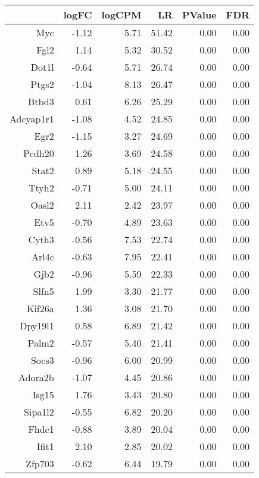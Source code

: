 \begin{table}[ht]
\centering
\begin{tabular}{rrrrrr}
  \hline
 & logFC & logCPM & LR & PValue & FDR \\ 
  \hline
Myc & -1.12 & 5.71 & 51.42 & 0.00 & 0.00 \\ 
  Fgl2 & 1.14 & 5.32 & 30.52 & 0.00 & 0.00 \\ 
  Dot1l & -0.64 & 5.71 & 26.74 & 0.00 & 0.00 \\ 
  Ptgs2 & -1.04 & 8.13 & 26.47 & 0.00 & 0.00 \\ 
  Btbd3 & 0.61 & 6.26 & 25.29 & 0.00 & 0.00 \\ 
  Adcyap1r1 & -1.08 & 4.52 & 24.85 & 0.00 & 0.00 \\ 
  Egr2 & -1.15 & 3.27 & 24.69 & 0.00 & 0.00 \\ 
  Pcdh20 & 1.26 & 3.69 & 24.58 & 0.00 & 0.00 \\ 
  Stat2 & 0.89 & 5.18 & 24.55 & 0.00 & 0.00 \\ 
  Ttyh2 & -0.71 & 5.00 & 24.11 & 0.00 & 0.00 \\ 
  Oasl2 & 2.11 & 2.42 & 23.97 & 0.00 & 0.00 \\ 
  Etv5 & -0.70 & 4.89 & 23.63 & 0.00 & 0.00 \\ 
  Cyth3 & -0.56 & 7.53 & 22.74 & 0.00 & 0.00 \\ 
  Arl4c & -0.63 & 7.95 & 22.41 & 0.00 & 0.00 \\ 
  Gjb2 & -0.96 & 5.59 & 22.33 & 0.00 & 0.00 \\ 
  Slfn5 & 1.99 & 3.30 & 21.77 & 0.00 & 0.00 \\ 
  Kif26a & 1.36 & 3.08 & 21.70 & 0.00 & 0.00 \\ 
  Dpy19l1 & 0.58 & 6.89 & 21.42 & 0.00 & 0.00 \\ 
  Palm2 & -0.57 & 5.40 & 21.41 & 0.00 & 0.00 \\ 
  Socs3 & -0.96 & 6.00 & 20.99 & 0.00 & 0.00 \\ 
  Adora2b & -1.07 & 4.45 & 20.86 & 0.00 & 0.00 \\ 
  Isg15 & 1.76 & 3.43 & 20.80 & 0.00 & 0.00 \\ 
  Sipa1l2 & -0.55 & 6.82 & 20.20 & 0.00 & 0.00 \\ 
  Fhdc1 & -0.88 & 3.89 & 20.04 & 0.00 & 0.00 \\ 
  Ifit1 & 2.10 & 2.85 & 20.02 & 0.00 & 0.00 \\ 
  Zfp703 & -0.62 & 6.44 & 19.79 & 0.00 & 0.00 \\ 

\end{tabular}
\end{table}
